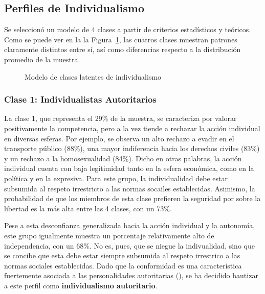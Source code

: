 \documentclass[
  letterpaper,
  DIV=11,
  numbers=noendperiod]{scrartcl}
\makeatletter
\newcommand*\pandocbounded[1]{%
  \sbox\pandoc@box{#1}%
  \Gscale@div\@tempa{\textheight}{\dimexpr\ht\pandoc@box+\dp\pandoc@box\relax}%
  \Gscale@div\@tempb{\linewidth}{\wd\pandoc@box}%
  \ifdim\@tempb\p@<\@tempa\p@\let\@tempa\@tempb\fi%
  \ifdim\@tempa\p@<\p@\scalebox{\@tempa}{\usebox\pandoc@box}%
  \else\usebox{\pandoc@box}%
  \fi%
}
\makeatother
\begin{document}
\subsection{Perfiles de
Individualismo}\label{perfiles-de-individualismo}

Se seleccionó un modelo de 4 clases a partir de criterios estadísticos y
teóricos. Como se puede ver en la la Figura~\ref{fig-lca}, las cuatros
clases muestran patrones claramente distintos entre sí, así como
diferencias respecto a la distribución promedio de la muestra.

\begin{figure}[H]

\centering{

\pandocbounded{\texttt{[image: paper\_files/figure-pdf/fig-lca-1.pdf]}}

}

\caption{\label{fig-lca}Modelo de clases latentes de individualismo}

\end{figure}%

\subsubsection{Clase 1: Individualistas
Autoritarios}\label{clase-1-individualistas-autoritarios}

La clase 1, que representa el 29\% de la muestra, se caracteriza por
valorar positivamente la competencia, pero a la vez tiende a rechazar la
acción individual en diversas esferas. Por ejemplo, se observa un alto
rechazo a evadir en el transporte público (88\%), una mayor indiferencia
hacia los derechos civiles (83\%) y un rechazo a la homosexualidad
(84\%). Dicho en otras palabras, la acción individual cuenta con baja
legitimidad tanto en la esfera económica, como en la política y en la
expresiva. Para este grupo, la individualidad debe estar subsumida al
respeto irrestricto a las normas socailes establecidas. Asimismo, la
probabilidad de que los miembros de esta clase prefieren la seguridad
por sobre la libertad es la más alta entre las 4 clases, con un 73\%.

Pese a esta desconfianza generalizada hacia la acción individual y la
autonomía, este grupo igualmente muestra un porcentaje relativamente
alto de independencia, con un 68\%. No es, pues, que se niegue la
indivualidad, sino que se concibe que esta debe estar siempre subsumida
al respeto irrestrico a las normas sociales establecidas. Dado que la
conformidad es una característica fuertemente asociada a las
personalidades autoritarias (), se ha decidido bautizar a este perfil como
\textbf{individualismo autoritario}.
\end{document}
